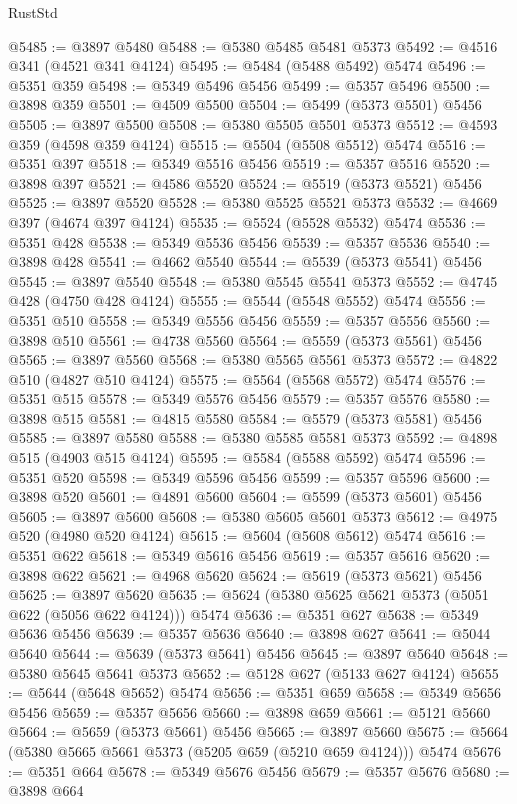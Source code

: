 \begin{lexlean}{RustStd}
\begin{coremodule}
@5485 := @3897 @5480
@5488 := @5380 @5485 @5481 @5373
@5492 := @4516 @341 (@4521 @341 @4124)
@5495 := @5484 (@5488 @5492) @5474
@5496 := @5351 @359
@5498 := @5349 @5496 @5456
@5499 := @5357 @5496
@5500 := @3898 @359
@5501 := @4509 @5500
@5504 := @5499 (@5373 @5501) @5456
@5505 := @3897 @5500
@5508 := @5380 @5505 @5501 @5373
@5512 := @4593 @359 (@4598 @359 @4124)
@5515 := @5504 (@5508 @5512) @5474
@5516 := @5351 @397
@5518 := @5349 @5516 @5456
@5519 := @5357 @5516
@5520 := @3898 @397
@5521 := @4586 @5520
@5524 := @5519 (@5373 @5521) @5456
@5525 := @3897 @5520
@5528 := @5380 @5525 @5521 @5373
@5532 := @4669 @397 (@4674 @397 @4124)
@5535 := @5524 (@5528 @5532) @5474
@5536 := @5351 @428
@5538 := @5349 @5536 @5456
@5539 := @5357 @5536
@5540 := @3898 @428
@5541 := @4662 @5540
@5544 := @5539 (@5373 @5541) @5456
@5545 := @3897 @5540
@5548 := @5380 @5545 @5541 @5373
@5552 := @4745 @428 (@4750 @428 @4124)
@5555 := @5544 (@5548 @5552) @5474
@5556 := @5351 @510
@5558 := @5349 @5556 @5456
@5559 := @5357 @5556
@5560 := @3898 @510
@5561 := @4738 @5560
@5564 := @5559 (@5373 @5561) @5456
@5565 := @3897 @5560
@5568 := @5380 @5565 @5561 @5373
@5572 := @4822 @510 (@4827 @510 @4124)
@5575 := @5564 (@5568 @5572) @5474
@5576 := @5351 @515
@5578 := @5349 @5576 @5456
@5579 := @5357 @5576
@5580 := @3898 @515
@5581 := @4815 @5580
@5584 := @5579 (@5373 @5581) @5456
@5585 := @3897 @5580
@5588 := @5380 @5585 @5581 @5373
@5592 := @4898 @515 (@4903 @515 @4124)
@5595 := @5584 (@5588 @5592) @5474
@5596 := @5351 @520
@5598 := @5349 @5596 @5456
@5599 := @5357 @5596
@5600 := @3898 @520
@5601 := @4891 @5600
@5604 := @5599 (@5373 @5601) @5456
@5605 := @3897 @5600
@5608 := @5380 @5605 @5601 @5373
@5612 := @4975 @520 (@4980 @520 @4124)
@5615 := @5604 (@5608 @5612) @5474
@5616 := @5351 @622
@5618 := @5349 @5616 @5456
@5619 := @5357 @5616
@5620 := @3898 @622
@5621 := @4968 @5620
@5624 := @5619 (@5373 @5621) @5456
@5625 := @3897 @5620
@5635 := @5624 (@5380 @5625 @5621 @5373 (@5051 @622 (@5056 @622 @4124))) @5474
@5636 := @5351 @627
@5638 := @5349 @5636 @5456
@5639 := @5357 @5636
@5640 := @3898 @627
@5641 := @5044 @5640
@5644 := @5639 (@5373 @5641) @5456
@5645 := @3897 @5640
@5648 := @5380 @5645 @5641 @5373
@5652 := @5128 @627 (@5133 @627 @4124)
@5655 := @5644 (@5648 @5652) @5474
@5656 := @5351 @659
@5658 := @5349 @5656 @5456
@5659 := @5357 @5656
@5660 := @3898 @659
@5661 := @5121 @5660
@5664 := @5659 (@5373 @5661) @5456
@5665 := @3897 @5660
@5675 := @5664 (@5380 @5665 @5661 @5373 (@5205 @659 (@5210 @659 @4124))) @5474
@5676 := @5351 @664
@5678 := @5349 @5676 @5456
@5679 := @5357 @5676
@5680 := @3898 @664

\end{coremodule}
\end{lexlean}
